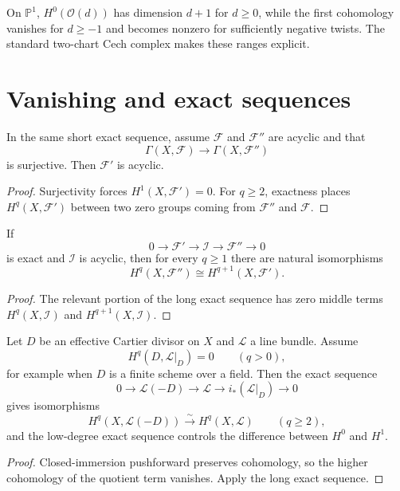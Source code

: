 \begin{example}\label{ex:vi49-expand-03}
On $\mathbb P^1$, $H^0(\mathcal O(d))$ has dimension $d+1$ for $d\ge0$, while the first cohomology vanishes for $d\ge-1$ and becomes nonzero for sufficiently negative twists.  The standard two-chart Cech complex makes these ranges explicit.
\end{example}
\section{Vanishing and exact sequences}

\begin{proposition}\label{prop:vi49-acyclic-subobject}
In the same short exact sequence, assume $\mathcal F$ and $\mathcal F''$ are acyclic and that
\[
\Gamma(X,\mathcal F)\to\Gamma(X,\mathcal F'')
\]
is surjective. Then $\mathcal F'$ is acyclic.
\begin{proof}
Surjectivity forces $H^1(X,\mathcal F')=0$. For $q\ge2$, exactness places $H^q(X,\mathcal F')$ between two zero groups coming from $\mathcal F''$ and $\mathcal F$.
\end{proof}
\end{proposition}

\begin{proposition}\label{prop:vi49-dimension-shift}
If
\[
0\to\mathcal F'\to\mathcal I\to\mathcal F''\to0
\]
is exact and $\mathcal I$ is acyclic, then for every $q\ge1$ there are natural isomorphisms
\[
H^q(X,\mathcal F'')\cong H^{q+1}(X,\mathcal F').
\]
\begin{proof}
The relevant portion of the long exact sequence has zero middle terms $H^q(X,\mathcal I)$ and $H^{q+1}(X,\mathcal I)$.
\end{proof}
\end{proposition}

\begin{proposition}\label{prop:vi49-divisor-consequence}
Let $D$ be an effective Cartier divisor on $X$ and $\mathcal L$ a line bundle. Assume
\[
H^q(D,\mathcal L|_D)=0\qquad(q>0),
\]
for example when $D$ is a finite scheme over a field. Then the exact sequence
\[
0\to\mathcal L(-D)\to\mathcal L\to i_*(\mathcal L|_D)\to0
\]
gives isomorphisms
\[
H^q(X,\mathcal L(-D))\xrightarrow{\sim}H^q(X,\mathcal L)
\qquad(q\ge2),
\]
and the low-degree exact sequence controls the difference between $H^0$ and $H^1$.
\begin{proof}
Closed-immersion pushforward preserves cohomology, so the higher cohomology of the quotient term vanishes. Apply the long exact sequence.
\end{proof}
\end{proposition}

